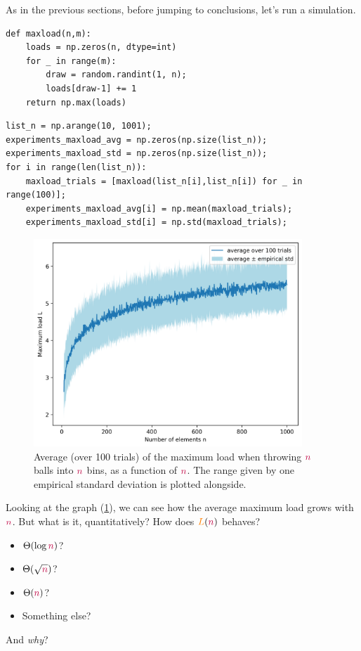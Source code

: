 As in the previous sections, before jumping to conclusions, let's run a simulation.
\begin{lstlisting}
def maxload(n,m):
    loads = np.zeros(n, dtype=int)
    for _ in range(m):
        draw = random.randint(1, n);
        loads[draw-1] += 1
    return np.max(loads)
\end{lstlisting}
\begin{lstlisting}
list_n = np.arange(10, 1001);
experiments_maxload_avg = np.zeros(np.size(list_n));
experiments_maxload_std = np.zeros(np.size(list_n));
for i in range(len(list_n)):
    maxload_trials = [maxload(list_n[i],list_n[i]) for _ in range(100)];
    experiments_maxload_avg[i] = np.mean(maxload_trials);
    experiments_maxload_std[i] = np.std(maxload_trials);
\end{lstlisting}
\begin{figure}[htbp]\centering
    \label{fig:maxload:1}
\includegraphics[width=0.9\textwidth]{figures/fig-maxload1.png}
\caption{Average (over 100 trials) of the maximum load when throwing $\textcolor{purple}{n}$ balls into $\textcolor{purple}{n}$ bins, as a function of $\textcolor{purple}{n}$. The range given by one empirical standard deviation is plotted alongside.}
\end{figure}

Looking at the graph (\cref{fig:maxload:1}), we can see how the average maximum load grows with $\textcolor{purple}{n}$. But what is it, quantitatively? How does $\textcolor{orange}{L}(\textcolor{purple}{n})$ behaves?
\begin{itemize}
    \item $\Theta(\log\textcolor{purple}{n})$?
    \item $\Theta(\sqrt{\textcolor{purple}{n}})$?
    \item $\Theta(\textcolor{purple}{n})$?
    \item Something else?
\end{itemize}
And \emph{why}?\medskip

